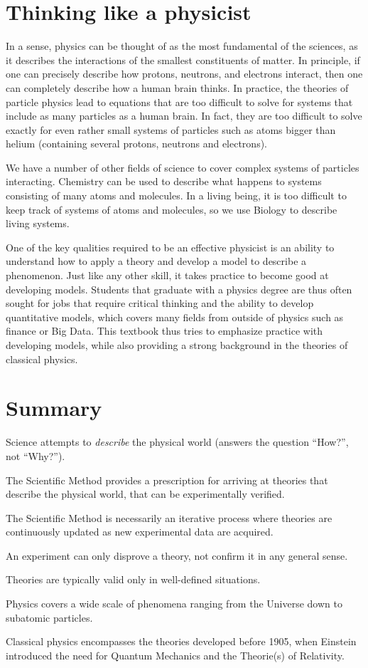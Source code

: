 \section{Thinking like a physicist}
In a sense, physics can be thought of as the most fundamental of the sciences, as it describes the interactions of the smallest constituents of matter. In principle, if one can precisely describe how protons, neutrons, and electrons interact, then one can completely describe how a human brain thinks. In practice, the theories of particle physics lead to equations that are too difficult to solve for systems that include as many particles as a human brain. In fact, they are too difficult to solve exactly for even rather small systems of particles such as atoms bigger than helium (containing several protons, neutrons and electrons). 

We have a number of other fields of science to cover complex systems of particles interacting. Chemistry can be used to describe what happens to systems consisting of many atoms and molecules. In a living being, it is too difficult to keep track of systems of atoms and molecules, so we use Biology to describe living systems. 

One of the key qualities required to be an effective physicist is an ability to understand how to apply a theory and develop a model to describe a phenomenon. Just like any other skill, it takes practice to become good at developing models. Students that graduate with a physics degree are thus often sought for jobs that require critical thinking and the ability to develop quantitative models, which covers many fields from outside of physics such as finance or Big Data. This textbook thus tries to emphasize practice with developing models, while also providing a strong background in the theories of classical physics. 

\newpage
\section{Summary}
\vspace{2cm}
\begin{chapterSummary}
\item Science attempts to \textit{describe} the physical world (answers the question ``How?'', not ``Why?'').
\item The Scientific Method provides a prescription for arriving at theories that describe the physical world, that can be 
experimentally verified.
\item The Scientific Method is necessarily an iterative process where theories are continuously updated as new experimental data are acquired.
\item An experiment can only disprove a theory, not confirm it in any general sense.
\item Theories are typically valid only in well-defined situations.
\item Physics covers a wide scale of phenomena ranging from the Universe down to subatomic particles.
\item Classical physics encompasses the theories developed before 1905, when Einstein introduced the need for Quantum Mechanics and the Theorie(s) of Relativity.
\end{chapterSummary}